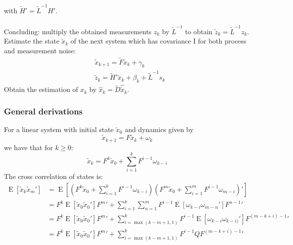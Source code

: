 \documentclass[oneside,12pt]{article}
\begin{document}
%
with $\tilde{H}' = \tilde{L}^{-1} H'$.\\\\
%
Concluding: multiply the obtained measurements $z_k$ by $\tilde{L}^{-1}$ to obtain $\tilde{z}_k = \tilde{L}^{-1} z_k$. Estimate the state $\tilde{x}_k$ of the next system which has covariance I for both process and measurement noise:
%
\begin{equation}
    \begin{split}
        &\tilde{x}_{k+1} = \tilde{F}\tilde{x}_k + \gamma_k\\
        &\tilde{z}_k = \tilde{H}' \tilde{x}_k + \beta_k + \tilde{L}^{-1} s_k
    \end{split}
\end{equation}
%
Obtain the estimation of $x_k$ by $\hat{x}_k = \tilde{D}\hat{\tilde{x}}_k$.
%
\subsubsection{General derivations}
%
For a linear system with initial state $\tilde{x}_0$ and dynamics given by
%
\begin{equation}
    \tilde{x}_{k+1} = F \tilde{x}_k + \omega_k
\end{equation}
%
we have that for $k \geq 0$:
%
\begin{equation}\label{eq:dynamicsGeneralExp}
    \tilde{x}_{k} = F^k \tilde{x}_0 + \sum_{i=1}^k F^{i-1} \omega_{k-i}
\end{equation}
%
The cross correlation of states is:
%
\begin{equation}\label{eq:stateCrossCorr}
    \begin{split}
        \operatorname{E}[\tilde{x}_k \tilde{x}_m'] &= \operatorname{E}[(F^k \tilde{x}_0 + \sum_{i=1}^k F^{i-1} \omega_{k-i}) (F^m \tilde{x}_0 + \sum_{i=1}^m F^{i-1} \omega_{m-i})']\\
        &= F^k \operatorname{E}[ \tilde{x}_0  \tilde{x}_0' ] F^m' +
       \sum_{i=1}^k \sum_{n=1}^m F^{i-1} \operatorname{E}[  \omega_{k-i}   \omega_{m-n}' ] F^{n-1}'\\
        &= F^k \operatorname{E}[ \tilde{x}_0  \tilde{x}_0' ] F^m' +
       \sum_{i=\operatorname{max}(k-m+1, 1)}^k F^{i-1} \operatorname{E}[  \omega_{k-i}   \omega_{k-i)}' ] F^{(m-k+i)-1}'\\
        &= F^k \operatorname{E}[ \tilde{x}_0  \tilde{x}_0' ] F^m' +
       \sum_{i=\operatorname{max}(k-m+1, 1)}^k F^{i-1} Q F^{(m-k+i)-1}'
    \end{split}
\end{equation}
\end{document}
